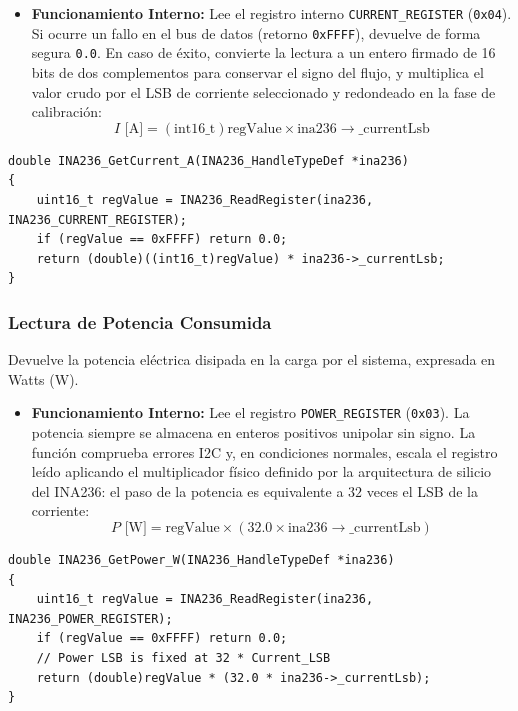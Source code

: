 \documentclass[
10pt, %
a4paper, %
oneside, %
headinclude,footinclude, %
BCOR5mm, %
]{scrartcl}
\begin{document}
\begin{itemize}
	\item \textbf{Funcionamiento Interno:}
		Lee el registro interno \texttt{CURRENT\_REGISTER} (\texttt{0x04}). Si ocurre un fallo en el bus de datos (retorno \texttt{0xFFFF}), devuelve de forma segura \texttt{0.0}. En caso de éxito, convierte la lectura a un entero firmado de 16 bits de dos complementos para conservar el signo del flujo, y multiplica el valor crudo por el LSB de corriente seleccionado y redondeado en la fase de calibración:
		\begin{equation}
			I\text{ [A]} = (\text{int16\_t})\text{regValue} \times \text{ina236}\rightarrow\text{\_currentLsb}
		\end{equation}
\end{itemize}

\begin{lstlisting}[style=CMakeStyle]
double INA236_GetCurrent_A(INA236_HandleTypeDef *ina236)
{
    uint16_t regValue = INA236_ReadRegister(ina236, INA236_CURRENT_REGISTER);
    if (regValue == 0xFFFF) return 0.0;
    return (double)((int16_t)regValue) * ina236->_currentLsb;
}
\end{lstlisting}

\subsubsection{Lectura de Potencia Consumida}
Devuelve la potencia eléctrica disipada en la carga por el sistema, expresada en Watts (W).

\begin{itemize}
	\item \textbf{Funcionamiento Interno:}
		Lee el registro \texttt{POWER\_REGISTER} (\texttt{0x03}). La potencia siempre se almacena en enteros positivos unipolar sin signo. La función comprueba errores I2C y, en condiciones normales, escala el registro leído aplicando el multiplicador físico definido por la arquitectura de silicio del INA236: el paso de la potencia es equivalente a $32$ veces el LSB de la corriente:
		\begin{equation}
			P\text{ [W]} = \text{regValue} \times (32.0 \times \text{ina236}\rightarrow\text{\_currentLsb})
		\end{equation}
\end{itemize}

\begin{lstlisting}[style=CMakeStyle]
double INA236_GetPower_W(INA236_HandleTypeDef *ina236)
{
    uint16_t regValue = INA236_ReadRegister(ina236, INA236_POWER_REGISTER);
    if (regValue == 0xFFFF) return 0.0;
    // Power LSB is fixed at 32 * Current_LSB
    return (double)regValue * (32.0 * ina236->_currentLsb);
}
\end{lstlisting}
\end{document}
